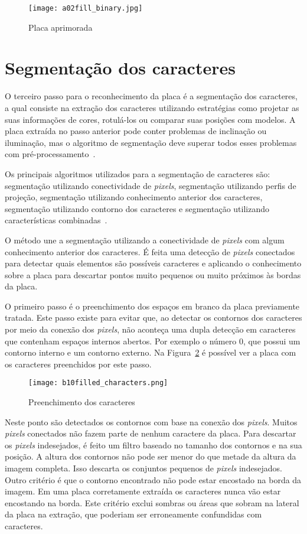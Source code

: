\begin{figure}[H]
	\centering
	\texttt{[image: a02fill\_binary.jpg]}
	\caption{Placa aprimorada}
	\label{fig:ext_enhanced_number_plate}
\end{figure}

\section{Segmentação dos caracteres}
\label{sec:segmentacao}

O terceiro passo para o reconhecimento da placa é a segmentação dos caracteres,
a qual consiste na extração dos caracteres utilizando estratégias como projetar
as suas informações de cores, rotulá-los ou comparar suas posições com modelos.
A placa extraída no passo anterior pode conter problemas de inclinação ou
iluminação, mas o algoritmo de segmentação deve superar todos esses problemas
com pré-processamento~\cite{s2013automatic}.

Os principais algoritmos utilizados para a segmentação de caracteres são:
segmentação utilizando conectividade de \emph{pixels}, segmentação utilizando
perfis de projeção, segmentação utilizando conhecimento anterior dos caracteres,
segmentação utilizando contorno dos caracteres e segmentação utilizando
características combinadas~\cite{s2013automatic}.

O método une a segmentação utilizando a conectividade de \emph{pixels} com algum
conhecimento anterior dos caracteres. É feita uma detecção de \emph{pixels}
conectados para detectar quais elementos são possíveis caracteres e aplicando o
conhecimento sobre a placa para descartar pontos muito pequenos ou muito
próximos às bordas da placa.

O primeiro passo é o preenchimento dos espaços em branco da placa previamente
tratada. Este passo existe para evitar que, ao detectar os contornos dos
caracteres por meio da conexão dos \emph{pixels}, não aconteça uma dupla
detecção em caracteres que contenham espaços internos abertos. Por exemplo o
número 0, que possui um contorno interno e um contorno externo. Na
Figura~\ref{fig:preenchimento} é possível ver a placa com os caracteres
preenchidos por este passo.

\begin{figure}[H]
	\centering
	\texttt{[image: b10filled\_characters.png]}
	\caption{Preenchimento dos caracteres}
	\label{fig:preenchimento}
\end{figure}

Neste ponto são detectados os contornos com base na conexão dos \emph{pixels}.
Muitos \emph{pixels} conectados não fazem parte de nenhum caractere da placa.
Para descartar os \emph{pixels} indesejados, é feito um filtro baseado no
tamanho dos contornos e na sua posição. A altura dos contornos não pode ser
menor do que metade da altura da imagem completa. Isso descarta os conjuntos
pequenos de \emph{pixels} indesejados. Outro critério é que o contorno
encontrado não pode estar encostado na borda da imagem. Em uma placa
corretamente extraída os caracteres nunca vão estar encostando na borda. Este
critério exclui sombras ou áreas que sobram na lateral da placa na extração, que
poderiam ser erroneamente confundidas com caracteres.

